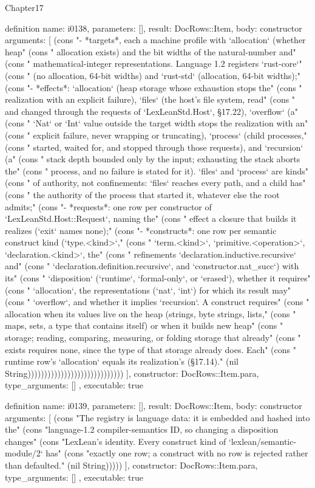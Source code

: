 \begin{lexlean}{Chapter17}
\begin{semanticmodule}
definition{
  name: i0138,
  parameters: [],
  result: DocRows::Item,
  body: constructor{
    arguments: [
      (cons "- *targets*, each a machine profile with `allocation` (whether heap" (cons "  allocation exists) and the bit widths of the natural-number and" (cons "  mathematical-integer representations. Language 1.2 registers `rust-core`" (cons "  (no allocation, 64-bit widths) and `rust-std` (allocation, 64-bit widths);" (cons "- *effects*: `allocation` (heap storage whose exhaustion stops the" (cons "  realization with an explicit failure), `files` (the host's file system, read" (cons "  and changed through the requests of `LexLeanStd.Host`, §17.22), `overflow` (a" (cons "  `Nat` or `Int` value outside the target width stops the realization with an" (cons "  explicit failure, never wrapping or truncating), `process` (child processes," (cons "  started, waited for, and stopped through those requests), and `recursion` (a" (cons "  stack depth bounded only by the input; exhausting the stack aborts the" (cons "  process, and no failure is stated for it). `files` and `process` are kinds" (cons "  of authority, not confinements: `files` reaches every path, and a child has" (cons "  the authority of the process that started it, whatever else the root admits;" (cons "- *requests*: one row per constructor of `LexLeanStd.Host::Request`, naming the" (cons "  effect a closure that builds it realizes (`exit` names none);" (cons "- *constructs*: one row per semantic construct kind (`type.<kind>`," (cons "  `term.<kind>`, `primitive.<operation>`, `declaration.<kind>`, the" (cons "  refinements `declaration.inductive.recursive` and" (cons "  `declaration.definition.recursive`, and `constructor.nat_succ`) with its" (cons "  `disposition` (`runtime`, `formal-only`, or `erased`), whether it requires" (cons "  `allocation`, the representations (`nat`, `int`) for which its result may" (cons "  `overflow`, and whether it implies `recursion`. A construct requires" (cons "  allocation when its values live on the heap (strings, byte strings, lists," (cons "  maps, sets, a type that contains itself) or when it builds new heap" (cons "  storage; reading, comparing, measuring, or folding storage that already" (cons "  exists requires none, since the type of that storage already does. Each" (cons "  runtime row's `allocation` equals its realization's (§17.14)." (nil String)))))))))))))))))))))))))))))
    ],
    constructor: DocRows::Item.para,
    type_arguments: []
  },
  executable: true
}

definition{
  name: i0139,
  parameters: [],
  result: DocRows::Item,
  body: constructor{
    arguments: [
      (cons "The registry is language data: it is embedded and hashed into the" (cons "language-1.2 compiler-semantics ID, so changing a disposition changes" (cons "LexLean's identity. Every construct kind of `lexlean/semantic-module/2` has" (cons "exactly one row; a construct with no row is rejected rather than defaulted." (nil String)))))
    ],
    constructor: DocRows::Item.para,
    type_arguments: []
  },
  executable: true
}


\end{semanticmodule}
\end{lexlean}
